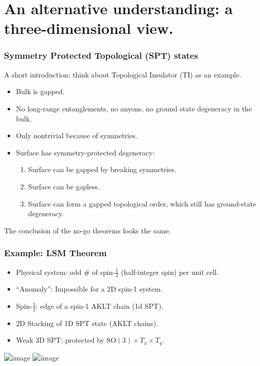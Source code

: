 \documentclass[xcolor=table, 10pt, aspectratio=169]{beamer}
\begin{document}
\section{An alternative understanding: a three-dimensional view.}

\begin{frame}
  \frametitle{Symmetry Protected Topological (SPT) states}
  A short introduction: think about Topological Insulator (TI) as an example.
  \begin{itemize}
    \item Bulk is gapped.
    \item No long-range entanglements, no anyons, no ground state degeneracy in the bulk.
    \item Only nontrivial because of symmetries.
    \item Surface has symmetry-protected degeneracy:
    \begin{enumerate}
      \item Surface can be gapped by breaking symmetries.
      \item Surface can be gapless.
      \item Surface can form a gapped topological order, which still has ground-state degeneracy.
    \end{enumerate}
  \end{itemize}
  The conclusion of the no-go theorems looks the same.
\end{frame}

\begin{frame}
  \frametitle{Example: LSM Theorem}
  \begin{itemize}
  \item Physical system: odd \# of spin-$\frac12$ (half-integer spin) per unit cell.
  \item ``Anomaly'': Impossible for a 2D spin-1 system.
  \item<2-> Spin-$\frac12$: edge of a spin-1 AKLT chain (1d SPT).
  \item<3-> 2D Stacking of 1D SPT state (AKLT chains).
  \item<3-> Weak 3D SPT: protected by
    $\text{SO}(3)\times T_x\times T_y$.
  \end{itemize}
  \begin{center}
      \includegraphics<1>{../dimer/weak3d_2d_blue}
      \includegraphics<3>{../dimer/weak3d_3d_blue}
  \end{center}
\end{frame}
\end{document}
